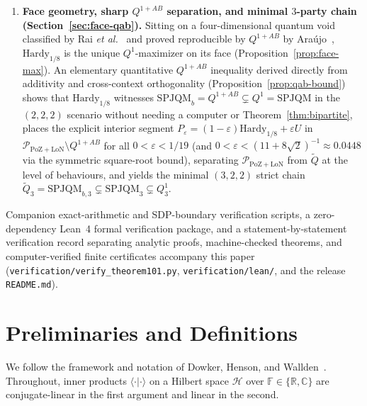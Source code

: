 \documentclass[11pt,a4paper]{article}
\theoremstyle{definition}
\theoremstyle{remark}
\newcommand{\HH}{\mathcal{H}}
\newcommand{\SPJQM}{\mathrm{SPJQM}}
\newcommand{\SPJQMb}{\mathrm{SPJQM}_b}
\newcommand{\Qone}{Q^{1}}
\newcommand{\QAB}{Q^{1+AB}}
\newcommand{\tQ}{\widetilde{Q}}
\newcommand{\PoZ}{\mathrm{PoZ}}
\newcommand{\LoN}{\mathrm{LoN}}
\newcommand{\PPoZ}{\mathcal{P}_{\PoZ+\LoN}}
\newcommand{\braket}[2]{\langle #1 | #2 \rangle}
\newcommand{\F}{\mathbb{F}}
\begin{document}
\begin{enumerate}[leftmargin=*,nosep]
\item \textbf{Face geometry, sharp $\QAB$ separation, and minimal $3$-party chain (Section~\ref{sec:face-qab}).} Sitting on a four-dimensional quantum void classified by Rai \emph{et al.}~\cite{Rai2019} and proved reproducible by $\QAB$ by Ara\'ujo~\cite{Araujo2023}, $\mathrm{Hardy}_{1/8}$ is the unique $\Qone$-maximizer on its face (Proposition~\ref{prop:face-max}). An elementary quantitative $\QAB$ inequality derived directly from additivity and cross-context orthogonality (Proposition~\ref{prop:qab-bound}) shows that $\mathrm{Hardy}_{1/8}$ witnesses $\SPJQMb = \QAB \subsetneq \Qone = \SPJQM$ in the $(2,2,2)$ scenario without needing a computer or Theorem~\ref{thm:bipartite}, places the explicit interior segment $P_\varepsilon = (1-\varepsilon)\mathrm{Hardy}_{1/8} + \varepsilon U$ in $\PPoZ \setminus \QAB$ for all $0 < \varepsilon < 1/19$ (and $0 < \varepsilon < (11+8\sqrt{2})^{-1} \approx 0.0448$ via the symmetric square-root bound), separating $\PPoZ$ from $\tQ$ at the level of behaviours, and yields the minimal $(3,2,2)$ strict chain $\tQ_3 = \mathrm{SPJQM}_{b,3} \subsetneq \SPJQM_3 \subsetneq \Qone_3$.
\end{enumerate}

Companion exact-arithmetic and SDP-boundary verification scripts, a zero-dependency Lean~4 formal verification package, and a statement-by-statement verification record separating analytic proofs, machine-checked theorems, and computer-verified finite certificates accompany this paper (\texttt{verification/verify\_theorem101.py}, \texttt{verification/lean/}, and the release \texttt{README.md}).

\section{Preliminaries and Definitions}
\label{sec:prelim}

We follow the framework and notation of Dowker, Henson, and Wallden~\cite{DHW2014}. Throughout, inner products $\braket{\cdot}{\cdot}$ on a Hilbert space $\HH$ over $\F \in \{\mathbb{R}, \mathbb{C}\}$ are conjugate-linear in the first argument and linear in the second.
\end{document}

